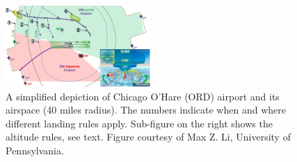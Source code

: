 \begin{figure}[t]
\centering
\includegraphics[width=0.49\textwidth]{figures/ATC_Example}
\caption{{\small A simplified depiction of Chicago O'Hare (ORD) airport and its airspace (40 miles radius). The numbers indicate when and where different landing rules apply. Sub-figure on the right shows the altitude rules, see text. Figure courtesy of Max Z. Li, University of Pennsylvania.}} 
\label{fig:atc_example}
\end{figure}

